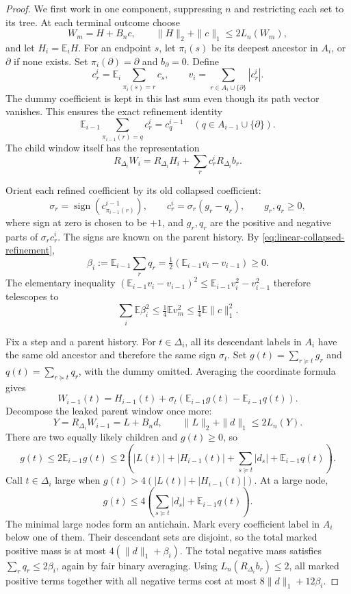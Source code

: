 \begin{proof}
We first work in one component, suppressing \(n\) and restricting each
set to its tree.  At each terminal outcome choose
\[
 W_m=H+B_nc,
 \qquad \|H\|_2+\|c\|_1\le2L_n(W_m),
\]
and let \(H_i=\mathbb E_iH\).  For an endpoint \(s\), let \(\pi_i(s)\)
be its deepest ancestor in \(A_i\), or \(\partial\) if none exists.
Set \(\pi_i(\partial)=\partial\) and \(b_\partial=0\).  Define
\[
 c_r^i=\mathbb E_i\sum_{\pi_i(s)=r}c_s,
 \qquad v_i=\sum_{r\in A_i\cup\{\partial\}}|c_r^i|.
\]
The dummy coefficient is kept in this last sum even though its path
vector vanishes.  This ensures the exact refinement identity
\begin{equation}\label{eq:linear-collapsed-refinement}
 \mathbb E_{i-1}\sum_{\pi_{i-1}(r)=q}c_r^i=c_q^{i-1}
 \quad(q\in A_{i-1}\cup\{\partial\}).
\end{equation}
The child window itself has the representation
\[
 R_{\Delta_i}W_i=R_{\Delta_i}H_i+\sum_rc_r^iR_{\Delta_i}b_r.
\]

Orient each refined coefficient by its old collapsed coefficient:
\[
 \sigma_r=\operatorname{sign}(c^{i-1}_{\pi_{i-1}(r)}),
 \qquad c_r^i=\sigma_r(g_r-q_r),\qquad g_r,q_r\ge0,
\]
where sign at zero is chosen to be \(+1\), and \(g_r,q_r\) are the
positive and negative parts of \(\sigma_rc_r^i\).  The signs are known
on the parent history.  By \eqref{eq:linear-collapsed-refinement},
\[
 \beta_i:=\mathbb E_{i-1}\sum_rq_r
       =\tfrac12(\mathbb E_{i-1}v_i-v_{i-1})\ge0.
\]
The elementary inequality
\((\mathbb E_{i-1}v_i-v_{i-1})^2
 \le\mathbb E_{i-1}v_i^2-v_{i-1}^2\)
therefore telescopes to
\begin{equation}\label{eq:linear-bad-mass-energy}
 \sum_i\mathbb E\beta_i^2\le\tfrac14\mathbb Ev_m^2
          \le\tfrac14\mathbb E\|c\|_1^2.
\end{equation}

Fix a step and a parent history.  For \(t\in \Delta_i\), all its descendant
labels in \(A_i\) have the same old ancestor and therefore the same
sign \(\sigma_t\).  Set
\(g(t)=\sum_{r\succeq t}g_r\) and
\(q(t)=\sum_{r\succeq t}q_r\), with the dummy omitted.  Averaging the
coordinate formula gives
\[
 W_{i-1}(t)=H_{i-1}(t)+
     \sigma_t(\mathbb E_{i-1}g(t)-\mathbb E_{i-1}q(t)).
\]
Decompose the leaked parent window once more:
\[
 Y=R_{\Delta_i}W_{i-1}=L+B_nd,
 \qquad \|L\|_2+\|d\|_1\le2L_n(Y).
\]
There are two equally likely children and \(g(t)\ge0\), so
\[
 g(t)\le2\mathbb E_{i-1}g(t)
 \le2\left(|L(t)|+|H_{i-1}(t)|+
                 \sum_{s\succeq t}|d_s|+\mathbb E_{i-1}q(t)\right).
\]
Call \(t\in \Delta_i\) large when
\(g(t)>4(|L(t)|+|H_{i-1}(t)|)\).  At a large node,
\[
 g(t)\le4\left(\sum_{s\succeq t}|d_s|+
                         \mathbb E_{i-1}q(t)\right).
\]
The minimal large nodes form an antichain.  Mark every coefficient
label in \(A_i\) below one of them.  Their descendant sets are disjoint,
so the total marked positive mass is at most
\(4(\|d\|_1+\beta_i)\).  The total negative mass satisfies
\(\sum_rq_r\le2\beta_i\), again by fair binary averaging.
Using \(L_n(R_{\Delta_i}b_r)\le2\), all marked positive terms together with
all negative terms cost at most \(8\|d\|_1+12\beta_i\).


\end{proof}

